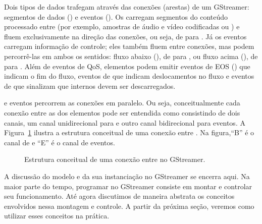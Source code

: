 \documentclass{SBCbookchapter}
\begin{document}
Dois tipos de dados trafegam através das conexões (arestas) de um
 GStreamer: segmentos de dados () e eventos
().  Os  carregam segmentos do conteúdo processado
entre  (por exemplo, amostras de áudio e vídeo codificadas ou
) e fluem exclusivamente na direção das conexões, ou seja, de
 para .  Já os eventos carregam informação de
controle; eles também fluem entre conexões, mas podem percorrê-las em ambos
os sentidos: fluxo abaixo (), de  para
, ou fluxo acima (), de  para
.  Além de eventos de QoS, elementos podem emitir eventos de
EOS () que indicam o fim do fluxo, eventos de 
que indicam deslocamentos no fluxo e eventos de  que sinalizam que
 internos devem ser descarregados.

 e eventos percorrem as conexões em paralelo.  Ou seja,
conceitualmente cada conexão entre as  dos elementos pode ser
entendida como consistindo de dois canais, um canal unidirecional para
 e outro canal bidirecional para eventos.
A Figura~\ref{fig:conexao} ilustra a estrutura conceitual de uma conexão
entre .  Na figura,``B'' é o canal de  e ``E'' é o
canal de eventos.

\begin{figure}[H]
  \centering
  \caption{Estrutura conceitual de uma conexão entre  no
    GStreamer.}
  \label{fig:conexao}
\end{figure}

A discussão do modelo  e da sua instanciação no GStreamer se
encerra aqui.  Na maior parte do tempo, programar no GStreamer consiste em
montar  e controlar seu funcionamento.  Até agora discutimos
de maneira abstrata os conceitos envolvidos nessa montagem e controle.  A
partir da próxima seção, veremos como utilizar esses conceitos na prática.
\end{document}

